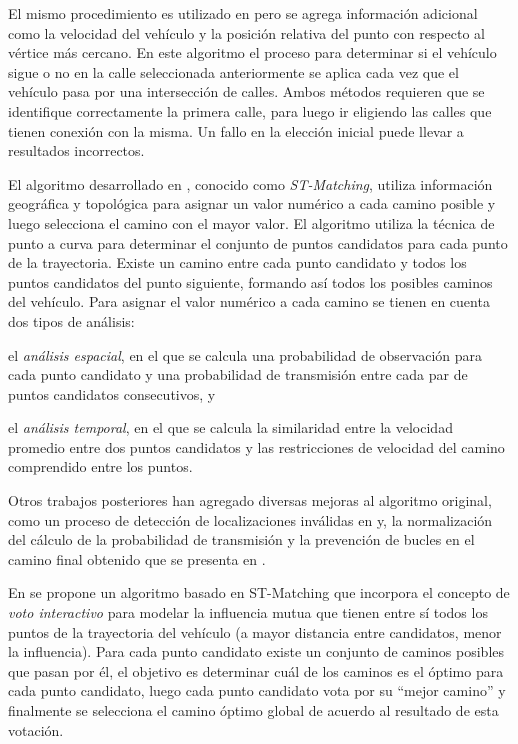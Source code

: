 El mismo procedimiento es utilizado en \cite{quddus2003general} pero se agrega información adicional como la velocidad del vehículo y la posición relativa del punto con respecto al vértice más cercano. En este algoritmo el proceso para determinar si el vehículo sigue o no en la calle seleccionada anteriormente se aplica cada vez que el vehículo pasa por una intersección de calles. Ambos métodos requieren que se identifique correctamente la primera calle, para luego ir eligiendo las calles que tienen conexión con la misma. Un fallo en la elección inicial puede llevar a resultados incorrectos.

El algoritmo desarrollado en \cite{lou2009map}, conocido como \emph{ST-Matching}, utiliza información geográfica y topológica para asignar un valor numérico a cada camino posible y luego selecciona el camino con el mayor valor. El algoritmo utiliza la técnica de punto a curva para determinar el conjunto de puntos candidatos para cada punto de la trayectoria. Existe un camino entre cada punto candidato y todos los puntos candidatos del punto siguiente, formando así todos los posibles caminos del vehículo. Para asignar el valor numérico a cada camino se tienen en cuenta dos tipos de análisis: \begin{enumerate*}[a)] \item el \emph{análisis espacial}, en el que se calcula una probabilidad de observación para cada punto candidato y una probabilidad de transmisión entre cada par de puntos candidatos consecutivos, y \item el \emph{análisis temporal}, en el que se calcula la similaridad entre la velocidad promedio entre dos puntos candidatos y las restricciones de velocidad del camino comprendido entre los puntos.\end{enumerate*} Otros trabajos posteriores han agregado diversas mejoras al algoritmo original, como un proceso de detección de localizaciones inválidas en  \cite{sakic2012map} y, la normalización del cálculo de la probabilidad de transmisión y la prevención de bucles en el camino final obtenido que se presenta en  \cite{budigm2012algorithm}.

En \cite{yuan2010interactive} se propone un algoritmo basado en ST-Matching que incorpora el concepto de \emph{voto interactivo} para modelar la influencia mutua que tienen entre sí todos los puntos de la trayectoria del vehículo (a mayor distancia entre candidatos, menor la influencia). Para cada punto candidato existe un conjunto de caminos posibles que pasan por él, el objetivo es determinar cuál de los caminos es el óptimo para cada punto candidato, luego cada punto candidato vota por su “mejor camino” y finalmente se selecciona el camino óptimo global de acuerdo al resultado de esta votación.

